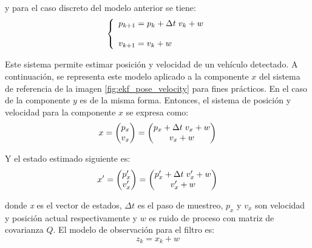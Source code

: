 y para el caso discreto del modelo anterior se tiene:
\begin{equation*}
    \left\lbrace
    \begin{array}{ll}
        p_{k+1} = p_{k} + \Delta t \hspace{0.1cm} v_{k} + w \\
        \\
        v_{k+1} = v_{k} + w
    \end{array}
    \right.
\end{equation*}

Este sistema permite estimar posición y velocidad de un vehículo detectado. A continuación, se representa este modelo aplicado a la componente $x$ del sistema de referencia de la imagen \ref{fig:ekf_pose_velocity} para fines prácticos. En el caso de la componente $y$ es de la misma forma. Entonces, el sistema de posición y velocidad para la componente $x$ se expresa como:
\begin{equation}
    x=\begin{pmatrix} 
        p_x \\
        v_x
    \end{pmatrix}
    =
    \begin{pmatrix}
        p_{x} + \Delta t \hspace{0.1cm} v_{x} + w \\
        v_{x} + w
    \end{pmatrix}
    \label{eqn:system_pose_vel}
\end{equation}

Y el estado estimado siguiente es:
\begin{equation}
    x'=\begin{pmatrix} 
        p'_x \\
        v'_x
    \end{pmatrix}
    =
    \begin{pmatrix}
        p'_{x} + \Delta t \hspace{0.1cm} v'_{x} + w \\
        v'_{x} + w
    \end{pmatrix}
\end{equation}

donde \textit{x} es el vector de estados, $\Delta t$ es el paso de muestreo, $p_{x}$ y $v_{x}$ son velocidad y posición actual respectivamente y $w$ es ruido de proceso con matriz de covarianza $Q$. El modelo de observación para el filtro es:
\begin{equation}
    z_k = x_k + w
\end{equation}

